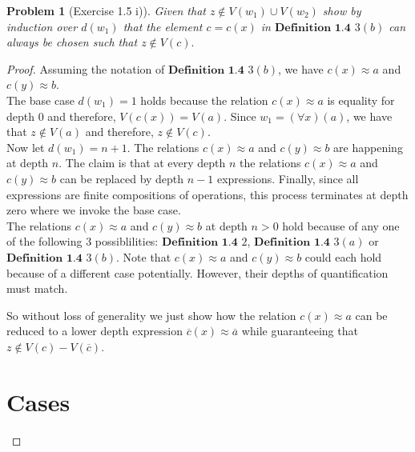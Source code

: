 \documentclass{article}
\theoremstyle{problemstyle}
\newtheorem{problem}{Problem}
\theoremstyle{lemmastyle}
\theoremstyle{theoremstyle}
\theoremstyle{problemstyle}
\begin{document}
\begin{problem}[Exercise 1.5 i)]
Given that $z \notin V(w_1) \cup V(w_2)$ show by induction over $d(w_1)$ that the element $c = c(x)$ in $\textbf{Definition 1.4}$ $3 (b)$ can always be chosen such that $z \notin V(c).$
\end{problem}

\begin{proof}
Assuming the notation of $\textbf{Definition 1.4}$ $3 (b)$, we have $c(x) \approx a$ and $c(y) \approx b$.\\ 

The base case $d(w_1) = 1$ holds because the relation $c(x) \approx a$ is equality for depth $0$ and therefore, $V(c(x)) = V(a)$. Since $w_1 = (\forall x)(a)$, we have that $z \notin V(a)$ and therefore, $z \notin V(c)$.\\ 

Now let $d(w_1) = n+1$. The relations $c(x) \approx a$ and $c(y) \approx b$ are happening at depth $n$. The claim is that at every depth $n$ the relations $c(x) \approx a$ and $c(y) \approx b$ can be replaced by depth $n-1$ expressions. Finally, since all expressions are finite compositions of operations, this process terminates at depth zero where we invoke the base case.\\ 

The relations $c(x) \approx a$ and $c(y) \approx b$ at depth $n > 0$ hold because of any one of the following 3 possiblilities: $\textbf{Definition 1.4}$ $2$, $\textbf{Definition 1.4}$ $3 (a)$ or $\textbf{Definition 1.4}$ $3 (b)$.  Note that $c(x) \approx a$ and $c(y) \approx b$ could each hold because of a different case potentially. However, their depths of quantification must match. 

So without loss of generality we just show how the relation $c(x) \approx a$ can be reduced to a lower depth expression  $\overline{c}(x) \approx \overline{a}$ while guaranteeing that $z \notin V(c) - V(\overline{c})$. 

\section*{Cases}

\end{proof}
\end{document}
